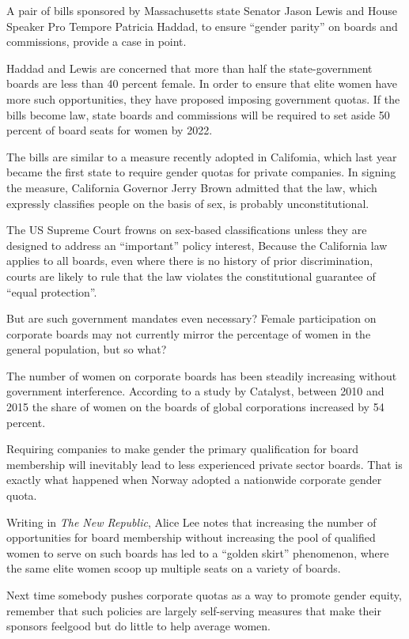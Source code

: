 A pair of bills sponsored by Massachusetts state Senator Jason Lewis and
House Speaker Pro Tempore Patricia Haddad, to ensure ``gender parity''
on boards and commissions, provide a case in point.


Haddad and Lewis are concerned that more than half the state-government
boards are less than 40 percent female. In order to ensure that elite
women have more such opportunities, they have proposed imposing
government quotas. If the bills become law, state boards and commissions
will be required to set aside 50 percent of board seats for women by 2022.

The bills are similar to a measure recently adopted in Califomia, which
last year became the first state to require gender quotas for private
companies. In signing the measure, California Governor Jerry Brown
admitted that the law, which expressly classifies people on the basis of
sex, is probably unconstitutional.

The US Supreme Court frowns on sex-based classifications unless they are
designed to address an ``important'' policy interest, Because the
California law applies to all boards, even where there is no history of
prior discrimination, courts are likely to rule that the law violates
the constitutional guarantee of ``equal protection''.

But are such government mandates even necessary? Female participation on
corporate boards may not currently mirror the percentage of women in the
general population, but so what?

The number of women on corporate boards has been steadily increasing
without government interference. According to a study by Catalyst,
between 2010 and 2015 the share of women on the boards of global
corporations increased by 54 percent.

Requiring companies to make gender the primary qualification for board
membership will inevitably lead to less experienced private sector
boards. That is exactly what happened when Norway adopted a nationwide
corporate gender quota.

Writing in \emph{The New Republic}, Alice Lee notes that increasing the
number of opportunities for board membership without increasing the pool
of qualified women to serve on such boards has led to a ``golden skirt''
phenomenon, where the same elite women scoop up multiple seats on a
variety of boards.

Next time somebody pushes corporate quotas as a way to promote gender
equity, remember that such policies are largely self-serving measures
that make their sponsors feelgood but do little to help average women.


